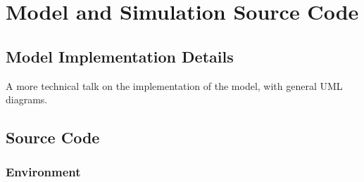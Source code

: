 \chapter{Model and Simulation Source Code}
\label{chapter:model-code}

\section{Model Implementation Details}

A more technical talk on the implementation of the model, with general UML diagrams.

\section{Source Code}

\subsection{Environment}













